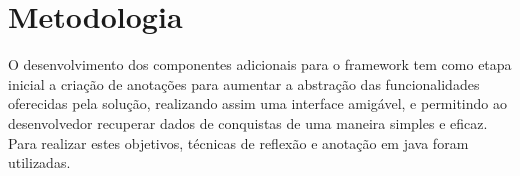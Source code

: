 \section{Metodologia}

\par O desenvolvimento dos componentes adicionais para o framework tem como etapa inicial a criação de anotações para aumentar a abstração das funcionalidades oferecidas pela solução, realizando assim uma interface amigável, e permitindo ao desenvolvedor recuperar dados de conquistas de uma maneira simples e eficaz. Para realizar estes objetivos, técnicas de reflexão e anotação em java foram utilizadas.
